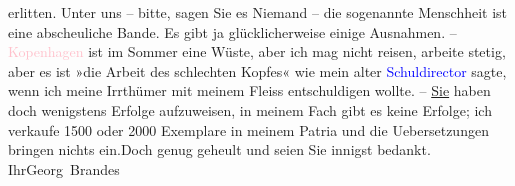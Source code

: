                erlitten. Unter uns – bitte, sagen Sie es Niemand – die sogenannte Menschheit ist
               eine abscheuliche Bande. Es gibt ja glücklicherweise einige Ausnahmen. – \textcolor{pink}{Kopenhagen}{}\ledrightnote{\textcolor{pink}{Kopenhagen}} ist im Sommer eine Wüste, aber ich mag
               nicht reisen, arbeite stetig, aber es ist »die Arbeit des schlechten Kopfes« wie mein
               alter \textcolor{blue}{Schuldirector}{} sagte, wenn
               ich meine Irrthümer mit meinem Fleiss entschuldigen wollte. – \uline{Sie} haben doch wenigstens Erfolge aufzuweisen, in meinem Fach gibt es
               keine Erfolge; ich verkaufe 1500 oder 2000 Exemplare in meinem Patria und die
               Uebersetzungen bringen nichts ein.\hspace*{2em}Doch genug
               geheult und seien Sie innigst bedankt. Ihr\spacefill\mbox{Georg Brandes}\pend
           \endnumbering{}  
      